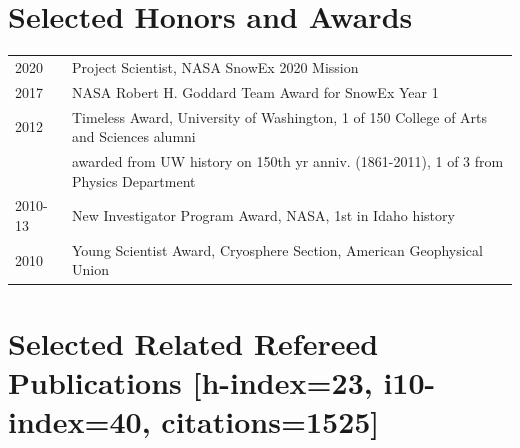 \documentclass[11pt]{article}
\begin{document}
\section*{Selected Honors and Awards}
\begin{tabular}{ll}
2020 & Project Scientist, NASA SnowEx 2020 Mission \\
2017 & NASA Robert H. Goddard Team Award for SnowEx Year 1 \\
2012 & Timeless Award, University of Washington, 1 of 150 College of Arts and Sciences alumni  \\
& awarded from UW history on 150th yr anniv. (1861-2011), 1 of 3 from Physics Department \\
2010-13 & New Investigator Program Award, NASA, 1st in Idaho history \\
2010 & Young Scientist Award, Cryosphere Section, American Geophysical Union \\
\end{tabular}



\section*{Selected Related Refereed Publications \small{[h-index=23, i10-index=40, citations=1525]}}

 \vspace{0.15cm}  \\
 \vspace{0.15cm} \\
  \vspace{0.15cm} \\
 \vspace{0.15cm} \\ 
 \vspace{0.15cm} 
\end{document}
